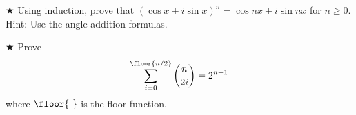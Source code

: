 


\begin{proofp}$\bigstar$
Using induction, prove that $(\cos{x}+i\sin{x})^n=\cos{nx}+i\sin{nx}$ for $n\ge0$.  Hint: Use the angle addition formulas.
\end{proofp}

\begin{proofp} $\bigstar$
Prove $$\sum_{i=0}^{\floor{n/2}}\binom{n}{2i}=2^{n-1}$$
where $\floor{\mbox{ }}$ is the floor function.
\end{proofp}

